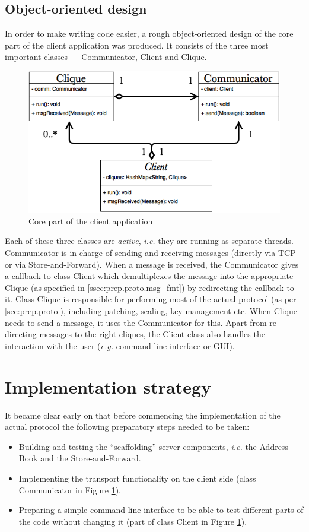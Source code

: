 \documentclass[a4paper, 12pt]{report}
\begin{document}
\subsection{Object-oriented design}
In order to make writing code easier, a rough object-oriented design of the core part of the client application was produced. It consists of the three most important classes --- Communicator, Client and Clique.

\begin{figure}[H]
    \centering
    \includegraphics[width = 0.7 \linewidth]{pics/core_uml.png}
    \caption{\label{fig:core_uml} Core part of the client application}
\end{figure}

Each of these three classes are \emph{active}, \textit{i.e.} they are running as separate threads. Communicator is in charge of sending and receiving messages (directly via TCP or via Store-and-Forward). When a message is received, the Communicator gives a callback to class Client which demultiplexes the message into the appropriate Clique (as specified in \cref{ssec:prep.proto.msg_fmt}) by redirecting the callback to it. Class Clique is responsible for performing most of the actual protocol (as per \cref{sec:prep.proto}), including patching, sealing, key management etc. When Clique needs to send a message, it uses the Communicator for this. Apart from re-directing messages to the right cliques, the Client class also handles the interaction with the user (\textit{e.g.} command-line interface or GUI).

\section{Implementation strategy}
\label{sec:prep.impl_strat}
It became clear early on that before commencing the implementation of the actual protocol the following preparatory steps needed to be taken:
\begin{itemize}
    \item Building and testing the ``scaffolding'' server components, \textit{i.e.} the Address Book and the Store-and-Forward.
    \item Implementing the transport functionality on the client side (class Communicator in Figure \ref{fig:core_uml}).
    \item Preparing a simple command-line interface to be able to test different parts of the code without changing it (part of class Client in Figure \ref{fig:core_uml}).
\end{itemize}
\end{document}
